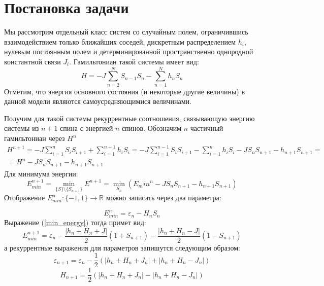 
\section{Постановка задачи}
	Мы рассмотрим отдельный класс систем со случайным полем, ограничившись взаимодействием только ближайших соседей, дискретным распределением $h_i$, нулевым постоянным полем и детерминированной пространственно однородной константной связи $J_i$. Гамильтониан такой системы имеет вид:
	\[
		H = - J \sum_{n=2}^{N} S_{n-1} S_n - \sum_{n=1}^N h_n S_n
	\]
	Отметим, что энергия основного состояния (и некоторые другие величины) в данной модели являются самоусредняющимися величинами.
	\newtheorem{ut}{Утверждение}
	\newtheorem*{zam}{Замечание}
	Получим для такой системы рекуррентные соотношения, связывающую энергию системы из $n+1$ спина с энергией $n$ спинов.  Обозначим $n$ частичный гамильтониан через $H^n$
	\begin{multline}
		H^{n+1} = - J\sum_{i=1} ^{n}  S_i S_{i+1} + \sum_{i=1}^{n+1} h_i S_i  = 
		-J \sum_{i=1}^{n-1} S_{i} S_{i+1} - \sum_{i=1}^{n} h_i S_i - J S_n S_{n+1} - h_{n+1} S_{n+1} = \\=
		H^n - J S_n S_{n+1} - h_{n+1} S_{n+1} 
	\end{multline}
	Для минимума энергии:
	\begin{equation}
	\label{min_energy}
	E_{min}^{n+1} = \min_{\{S\}\setminus \{S_{n+1}\}} E^{n+1} = \min_{S_n}(E_min^{n} - J S_n S_{n+1} - h_{n+1} S_{n+1})
	\end{equation}
	Отображение $E_{min}^n : \{-1, 1\}  \to \mathbb{R}$ можно записать через два параметра:
	
	\begin{equation}
	E^n_{min} = \varepsilon_n - H_n S_n
	\end{equation}
	Выражение (\ref{min_energy}) тогда примет вид:
	\begin{equation}
	E_{min}^{n+1} = \varepsilon_n - \frac {\left|h_n +H_n+J\right|} 2 (1+S_{n+1})  - \frac{\left|h_n+H_n-J\right|} 2 (1 - S_{n+1})
	\end{equation}
	а рекуррентные выражения для параметров запишутся следующим образом: 
	\begin{equation*}
	\varepsilon_{n+1} = \varepsilon_n - \frac{1} 2 \left(|h_n + H_n + J_n| + |h_n+H_n - J_n| \right)
	\end{equation*}
	\begin{equation*}
	\label{rec}
	H_{n+1} = \frac{1}{2} \left(|h_n + H_n + J_n| - |h_n + H_n - J_n| \right)
	\end{equation*}

